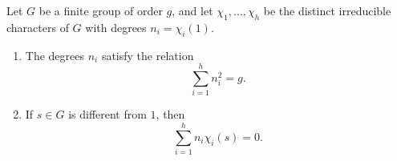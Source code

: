 Let $G$ be a finite group of order $g$, and let $\chi_1, \ldots, \chi_h$ be the distinct irreducible characters of $G$ with degrees $n_i = \chi_i(1)$.

\begin{enumerate}
\item[(a)] The degrees $n_i$ satisfy the relation
$$\sum_{i=1}^{h} n_i^2 = g.$$
\item[(b)] If $s \in G$ is different from $1$, then
$$\sum_{i=1}^{h} n_i \chi_i(s) = 0.$$
\end{enumerate}